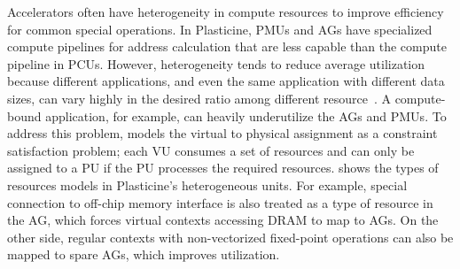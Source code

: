 Accelerators often have heterogeneity in compute resources to improve efficiency for common
special operations.
In Plasticine, PMUs and AGs have specialized compute pipelines for address calculation that are 
less capable than the compute pipeline in PCUs.
However, heterogeneity tends to reduce average utilization because different applications, and even the same application with different data sizes, can vary highly in the desired ratio among different
resource~\cite{tz_rnn}.
A compute-bound application, for example, can heavily underutilize the AGs and PMUs.
To address this problem, \name models the virtual to physical assignment as a constraint satisfaction problem; 
each VU consumes a set of resources and can only be assigned to a PU if the PU processes the required resources. 
 shows the types of resources \name models in Plasticine's heterogeneous units.
For example, special connection to off-chip memory interface is
also treated as a type of resource in the AG, which forces virtual contexts accessing DRAM to map to AGs. 
On the other side, regular contexts with non-vectorized fixed-point operations can also be mapped to
spare AGs, which improves utilization.
